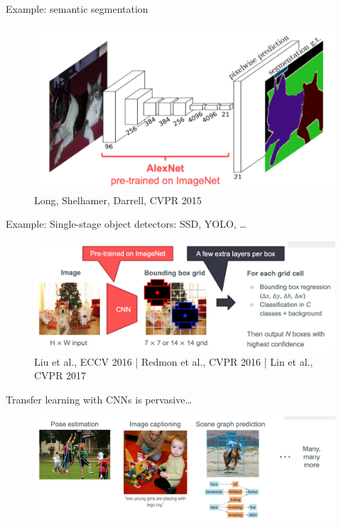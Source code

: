 \documentclass[serif, aspectratio=169]{beamer}
\begin{document}
\begin{frame}{Example: semantic segmentation}
	\begin{figure}[htpb]
		\begin{center}
			\includegraphics[keepaspectratio, scale=0.25]{pic/sem}
			\caption*{\scriptsize Long, Shelhamer, Darrell, CVPR 2015}
		\end{center}
	\end{figure}
\end{frame}

\begin{frame}{Example: Single-stage object detectors: SSD, YOLO, …}
	\begin{figure}[htpb]
		\begin{center}
			\includegraphics[keepaspectratio, scale=0.25]{pic/ssd}
			\caption*{\scriptsize Liu et al., ECCV 2016 | Redmon et al., CVPR 2016 | Lin et al., CVPR 2017}
		\end{center}
	\end{figure}
\end{frame}

\begin{frame}{Transfer learning with CNNs is pervasive…}
	\begin{figure}[htpb]
		\begin{center}
			\includegraphics[keepaspectratio, scale=0.25]{pic/TL_examples}
		\end{center}
	\end{figure}
\end{frame}
\end{document}

